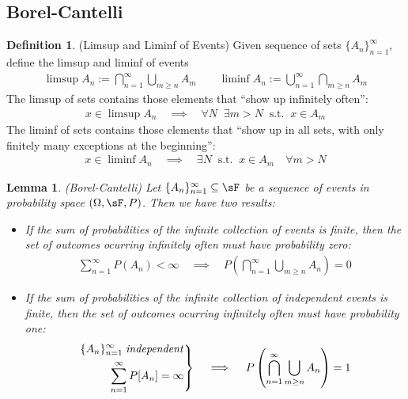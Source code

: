 \documentclass[12pt]{article}
\theoremstyle{plain}
\newtheorem{lem}[thm]{Lemma}
\theoremstyle{definition}
\newtheorem{defn}[thm]{Definition}
\theoremstyle{remark}
\newenvironment{rcases}
  {\left.\begin{aligned}}
  {\end{aligned}\right\rbrace}
\newcommand{\sumninf}{\sum^\infty_{n=1}}
\newcommand{\ninf}{_{n=1}^\infty}
\begin{document}
\clearpage
\subsection{Borel-Cantelli}

\begin{defn}(Limsup and Liminf of Events)
Given sequence of sets $\{A_n\}\ninf$, define the limsup and liminf of
events
\begin{align*}
  \limsup A_n := \bigcap\ninf \bigcup_{m \geq n} A_m
  \qquad
  \liminf A_n := \bigcup\ninf \bigcap_{m \geq n} A_m
\end{align*}
The limsup of sets contains those elements that ``show up infinitely
often'':
\begin{align*}
  x\in \limsup A_n
  \quad\implies\quad
  \forall N
  \;\; \exists m>N
  \;\; \text{s.t.}
  \;\; x\in A_m
\end{align*}
The liminf of sets contains those elements that ``show up in all sets,
with only finitely many exceptions at the beginning'':
\begin{align*}
  x\in \liminf A_n
  \quad\implies\quad
  \exists N
  \;\; \text{s.t.}\;\;
  x \in A_m
  \quad \forall m>N
\end{align*}
\end{defn}

\begin{lem}\emph{(Borel-Cantelli)}
Let $\{A_n\}\ninf\subseteq\sF$ be a sequence of events in probability
space $(\Omega,\sF,P)$. Then we have two results:
\begin{itemize}
  \item
    If the sum of probabilities of the infinite collection of events
    is finite, then the set of outcomes ocurring infinitely often must
    have probability zero:
    \begin{align*}
      \sumninf P(A_n) < \infty
      \quad\implies\quad
      P\left(\bigcap\ninf \bigcup_{m\geq n} A_n\right) = 0
    \end{align*}

  \item
    If the sum of probabilities of the infinite collection of
    independent events is finite, then the set of outcomes ocurring
    infinitely often must have probability one:
    \begin{align*}
      \begin{rcases}
        \{A_n\}\ninf \; \text{\emph{independent}}\\
        \sumninf P[A_n] = \infty
      \end{rcases}
      \quad\implies\quad
      P\left(\bigcap\ninf \bigcup_{m\geq n} A_n\right) = 1
    \end{align*}
\end{itemize}
\end{lem}
\end{document}
